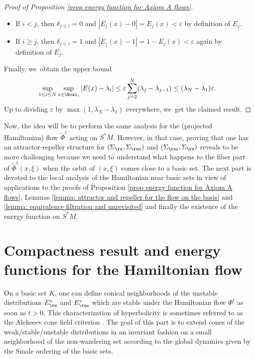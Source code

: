 \begin{proof}[Proof of Proposition \ref{prop energy function for Axiom A flows}]
\begin{itemize}
\item If $i < j$, then $\delta_{j \leq i} = 0$ and $|E_j (x) - 0| = E_j (x) < \varepsilon$ by definition of $E_j$.
\item If $i \geq j$, then $\delta_{j \leq i} = 1$ and $|E_j (x) - 1| = 1 - E_j (x) < \varepsilon$ again by definition of $E_j$.
\end{itemize}
Finally, we~obtain the upper bound
\[
\sup_{1 \leq i \leq N} \sup_{x \in \Ncal_i} |E (x) - \lambda_i| \leq \varepsilon \sum_{j = 2}^N (\lambda_j - \lambda_{j-1}) \leq (\lambda_N - \lambda_1) \varepsilon.
\]
Up to dividing $\varepsilon$ by $\max (1, \lambda_N- \lambda_1)$ everywhere, we~get the claimed result.
\end{proof}

Now, the idea will be to perform the same analysis for the (projected Hamiltonian) flow $\widetilde{\Phi}^t$ acting on $S^* M$. However, in that case, proving that one has an attractor-repeller structure for $(\Sigma_{\rs}, \Sigma_{\ruo})$ and $(\Sigma_{\rso}, \Sigma_{\ru})$ reveals to be more challenging because we need to understand what happens to the fiber part of $\widetilde{\Phi}^t (x,\xi)$ when the orbit of $(x,\xi)$ comes close to a basic set. The next part is devoted to the local analysis of the Hamiltonian near basic sets in view of applications to the proofs of Proposition \ref{prop energy function for Axiom A flows}, Lemmas \ref{lemma: attractor and repeller for the flow on the basis} and \ref{lemma: equivalence filtration and unrevisited} and finally the existence of the energy function on $S^*M$.

\section{Compactness result and energy functions for the Hamiltonian flow}\label{section: Compactness result and energy functions for the Hamiltonian flow}

On a basic set $K$, one can define conical neighborhoods of the unstable distributions $E_\ru^*$ and $E_{\ruo}^*$ which are stable under the Hamiltonian flow $\Phi^t$ as soon as $t > 0$. This characterization of hyperbolicity is sometimes referred to as the Alekseev cone field criterion \cite[Prop.\,5.1.7]{FH}. The goal of this part is to extend cones of the weak/stable/unstable distributions in an invariant fashion on a small neighborhood of the non-wandering set according to the global dynamics given by the Smale ordering of the basic sets.

